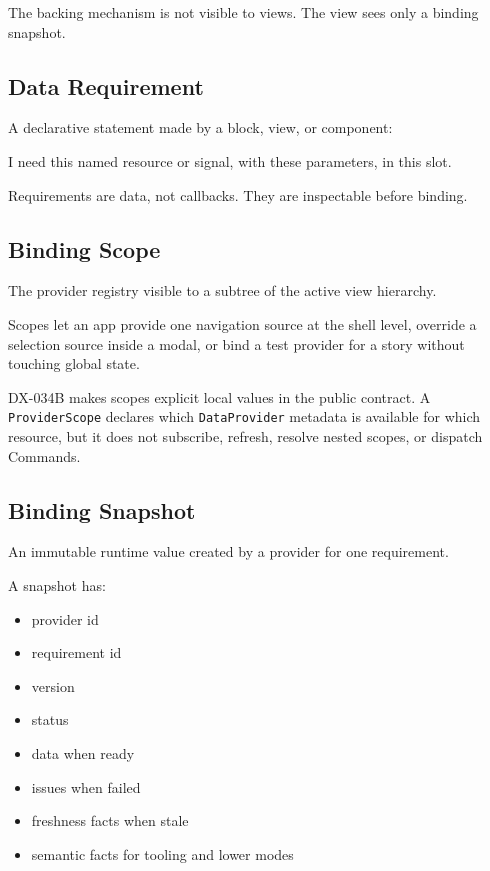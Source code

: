 The backing mechanism is not visible to views. The view sees only a binding snapshot.

\subsection{Data Requirement}\label{record-132-data-requirement}

A declarative statement made by a block, view, or component:

\begin{CodeBlock}
I need this named resource or signal, with these parameters, in this slot.
\end{CodeBlock}

Requirements are data, not callbacks. They are inspectable before binding.

\subsection{Binding Scope}\label{record-132-binding-scope}

The provider registry visible to a subtree of the active view hierarchy.

Scopes let an app provide one navigation source at the shell level, override a selection source inside a modal, or bind a test provider for a story without touching global state.

DX-034B makes scopes explicit local values in the public contract. A \texttt{P\allowbreak{}r\allowbreak{}o\allowbreak{}v\allowbreak{}i\allowbreak{}d\allowbreak{}e\allowbreak{}r\allowbreak{}S\allowbreak{}c\allowbreak{}o\allowbreak{}p\allowbreak{}e} declares which \texttt{D\allowbreak{}a\allowbreak{}t\allowbreak{}a\allowbreak{}P\allowbreak{}r\allowbreak{}o\allowbreak{}v\allowbreak{}i\allowbreak{}d\allowbreak{}e\allowbreak{}r} metadata is available for which resource, but it does not subscribe, refresh, resolve nested scopes, or dispatch Commands.

\subsection{Binding Snapshot}\label{record-132-binding-snapshot}

An immutable runtime value created by a provider for one requirement.

A snapshot has:

\begin{itemize}
\tightlist
\item
  provider id
\item
  requirement id
\item
  version
\item
  status
\item
  data when ready
\item
  issues when failed
\item
  freshness facts when stale
\item
  semantic facts for tooling and lower modes
\end{itemize}

